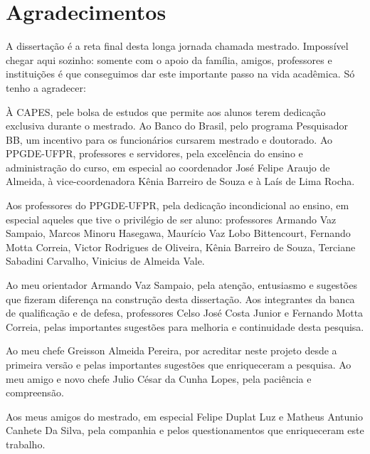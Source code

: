 \documentclass[../thesis.tex]{subfiles}
\begin{document}
	
	\newpage
	
	\section*{Agradecimentos} %
	
	\begin{spacing}{1.1}
		
	A dissertação é a reta final desta longa jornada chamada mestrado. Impossível chegar aqui sozinho: somente com o apoio da família, amigos, professores e instituições é que conseguimos dar este importante passo na vida acadêmica. Só tenho a agradecer:
	
	À CAPES, pele bolsa de estudos que permite aos alunos terem dedicação exclusiva durante o mestrado. Ao Banco do Brasil, pelo programa Pesquisador BB, um incentivo para os funcionários cursarem mestrado e doutorado. Ao PPGDE-UFPR, professores e servidores, pela excelência do ensino e administração do curso, em especial ao coordenador José Felipe Araujo de Almeida, à vice-coordenadora Kênia Barreiro de Souza e à Laís de Lima Rocha.

	Aos professores do PPGDE-UFPR, pela dedicação incondicional ao ensino, em especial aqueles que tive o privilégio de ser aluno: professores Armando Vaz Sampaio, Marcos Minoru Hasegawa, Maurício Vaz Lobo Bittencourt, Fernando Motta Correia, Victor Rodrigues de Oliveira, Kênia Barreiro de Souza, Terciane Sabadini Carvalho, Vinicius de Almeida Vale. %
	
	Ao meu orientador Armando Vaz Sampaio, pela atenção, entusiasmo e sugestões que fizeram diferença na construção desta dissertação. Aos integrantes da banca de qualificação e de defesa, professores Celso José Costa Junior e Fernando Motta Correia, pelas importantes sugestões para melhoria e continuidade desta pesquisa.

	Ao meu chefe Greisson Almeida Pereira, por acreditar neste projeto desde a primeira versão e pelas importantes sugestões que enriqueceram a pesquisa. Ao meu amigo e novo chefe Julio César da Cunha Lopes, pela paciência e compreensão.
	
	Aos meus amigos do mestrado, em especial Felipe Duplat Luz e Matheus Antunio Canhete Da Silva, pela companhia e pelos questionamentos que enriqueceram este trabalho.
	

\end{spacing}
\end{document}

